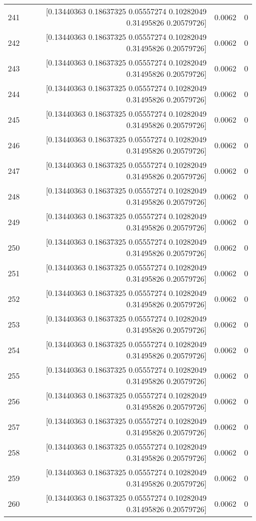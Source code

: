 \begin{longtable}{lrrr}
241 & [0.13440363 0.18637325 0.05557274 0.10282049 0.31495826 0.20579726] & 0.0062 & 0 \\
242 & [0.13440363 0.18637325 0.05557274 0.10282049 0.31495826 0.20579726] & 0.0062 & 0 \\
243 & [0.13440363 0.18637325 0.05557274 0.10282049 0.31495826 0.20579726] & 0.0062 & 0 \\
244 & [0.13440363 0.18637325 0.05557274 0.10282049 0.31495826 0.20579726] & 0.0062 & 0 \\
245 & [0.13440363 0.18637325 0.05557274 0.10282049 0.31495826 0.20579726] & 0.0062 & 0 \\
246 & [0.13440363 0.18637325 0.05557274 0.10282049 0.31495826 0.20579726] & 0.0062 & 0 \\
247 & [0.13440363 0.18637325 0.05557274 0.10282049 0.31495826 0.20579726] & 0.0062 & 0 \\
248 & [0.13440363 0.18637325 0.05557274 0.10282049 0.31495826 0.20579726] & 0.0062 & 0 \\
249 & [0.13440363 0.18637325 0.05557274 0.10282049 0.31495826 0.20579726] & 0.0062 & 0 \\
250 & [0.13440363 0.18637325 0.05557274 0.10282049 0.31495826 0.20579726] & 0.0062 & 0 \\
251 & [0.13440363 0.18637325 0.05557274 0.10282049 0.31495826 0.20579726] & 0.0062 & 0 \\
252 & [0.13440363 0.18637325 0.05557274 0.10282049 0.31495826 0.20579726] & 0.0062 & 0 \\
253 & [0.13440363 0.18637325 0.05557274 0.10282049 0.31495826 0.20579726] & 0.0062 & 0 \\
254 & [0.13440363 0.18637325 0.05557274 0.10282049 0.31495826 0.20579726] & 0.0062 & 0 \\
255 & [0.13440363 0.18637325 0.05557274 0.10282049 0.31495826 0.20579726] & 0.0062 & 0 \\
256 & [0.13440363 0.18637325 0.05557274 0.10282049 0.31495826 0.20579726] & 0.0062 & 0 \\
257 & [0.13440363 0.18637325 0.05557274 0.10282049 0.31495826 0.20579726] & 0.0062 & 0 \\
258 & [0.13440363 0.18637325 0.05557274 0.10282049 0.31495826 0.20579726] & 0.0062 & 0 \\
259 & [0.13440363 0.18637325 0.05557274 0.10282049 0.31495826 0.20579726] & 0.0062 & 0 \\
260 & [0.13440363 0.18637325 0.05557274 0.10282049 0.31495826 0.20579726] & 0.0062 & 0 \\

\end{longtable}
